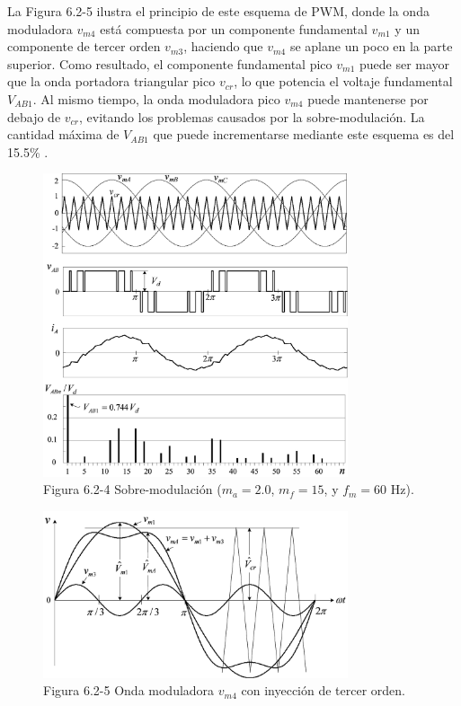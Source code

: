 \documentclass[letterpaper,12pt]{article}
\begin{document}
La Figura 6.2-5 ilustra el principio de este esquema de PWM, donde la onda moduladora $v_{m4}$ está compuesta por un componente fundamental $v_{m1}$ y un componente de tercer orden $v_{m3}$, haciendo que $v_{m4}$ se aplane un poco en la parte superior. Como resultado, el componente fundamental pico $v_{m1}$ puede ser mayor que la onda portadora triangular pico $v_{cr}$, lo que potencia el voltaje fundamental $V_{AB1}$. Al mismo tiempo, la onda moduladora pico $v_{m4}$ puede mantenerse por debajo de $v_{cr}$, evitando los problemas causados por la sobre-modulación. La cantidad máxima de $V_{AB1}$ que puede incrementarse mediante este esquema es del 15.5\% \cite{ref2, ref3}.

\begin{figure}[h]
	\centering
	\includegraphics[width=0.8\textwidth]{graficos/img85.jpg}
	\caption{Figura 6.2-4 Sobre-modulación ($m_a = 2.0$, $m_f = 15$, y $f_m = 60$ Hz).}
\end{figure}
\FloatBarrier

\begin{figure}[h]
	\centering
	\includegraphics[width=0.8\textwidth]{graficos/img86.jpg}
	\caption{Figura 6.2-5 Onda moduladora $v_{m4}$ con inyección de tercer orden.}
\end{figure}
\FloatBarrier
\end{document}
